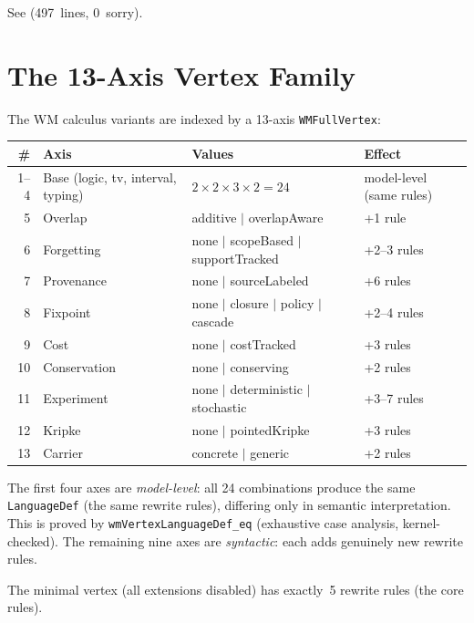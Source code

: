 \documentclass[11pt,openany]{report}
\begin{document}
\noindent
See 
(497~lines, 0~sorry).

\section{The 13-Axis Vertex Family}
\label{sec:wm-vertex-family}
\label{sec:wm-13axis}

The WM calculus variants are indexed by a 13-axis \texttt{WMFullVertex}:

\begin{center}
\begin{tabular}{rlll}
\toprule
\textbf{\#} & \textbf{Axis} & \textbf{Values} & \textbf{Effect} \\
\midrule
1--4 & Base (logic, tv, interval, typing)
     & $2 \times 2 \times 3 \times 2 = 24$
     & model-level (same rules) \\
5 & Overlap & additive $|$ overlapAware & +1 rule \\
6 & Forgetting & none $|$ scopeBased $|$ supportTracked & +2--3 rules \\
7 & Provenance & none $|$ sourceLabeled & +6 rules \\
8 & Fixpoint & none $|$ closure $|$ policy $|$ cascade & +2--4 rules \\
9 & Cost & none $|$ costTracked & +3 rules \\
10 & Conservation & none $|$ conserving & +2 rules \\
11 & Experiment & none $|$ deterministic $|$ stochastic & +3--7 rules \\
12 & Kripke & none $|$ pointedKripke & +3 rules \\
13 & Carrier & concrete $|$ generic & +2 rules \\
\bottomrule
\end{tabular}
\end{center}

The first four axes are \emph{model-level}: all 24 combinations produce the
same \texttt{LanguageDef} (the same rewrite rules), differing only in
semantic interpretation.  This is proved by \texttt{wmVertexLanguageDef\_eq}
(exhaustive case analysis, kernel-checked).  The remaining nine axes are
\emph{syntactic}: each adds genuinely new rewrite rules.

\begin{theorem}
The minimal vertex (all extensions disabled) has exactly~5 rewrite rules
(the core rules).
\end{theorem}
\end{document}
